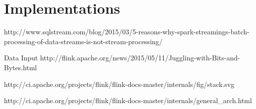 
\chapter{Implementations}

\ifpdf
    \graphicspath{{Chapter5/Figs/Raster/}{Chapter5/Figs/PDF/}{Chapter5/Figs/}}
\else
    \graphicspath{{Chapter5/Figs/Vector/}{Chapter5/Figs/}}
\fi



http://www.sqlstream.com/blog/2015/03/5-reasons-why-spark-streamings-batch-processing-of-data-streams-is-not-stream-processing/



Data Input
http://flink.apache.org/news/2015/05/11/Juggling-with-Bits-and-Bytes.html


http://ci.apache.org/projects/flink/flink-docs-master/internals/fig/stack.svg

http://ci.apache.org/projects/flink/flink-docs-master/internals/general\_arch.html
